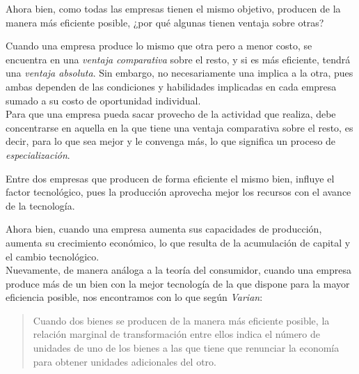 \documentclass[a4paper,12pt]{report}
\begin{document}
\vspace{0.5cm}

Ahora bien, como todas las empresas tienen el mismo objetivo, producen de la manera más eficiente posible, ¿por qué algunas tienen ventaja sobre otras?\\

\vspace{0.5cm}

Cuando una empresa produce lo mismo que otra pero a menor costo, se encuentra en una \emph{ventaja comparativa} sobre el resto, y si es más eficiente, tendrá una \emph{ventaja absoluta}. Sin embargo, no necesariamente una implica a la otra, pues ambas dependen de las condiciones y habilidades implicadas en cada empresa sumado a su costo de oportunidad individual.\\

Para que una empresa pueda sacar provecho de la actividad que realiza, debe concentrarse en aquella en la que tiene una ventaja comparativa sobre el resto, es decir, para lo que sea mejor y le convenga más, lo que significa un proceso de \emph{especialización}.\\

\vspace{0.5cm}

Entre dos empresas que producen de forma eficiente el mismo bien, influye el factor tecnológico, pues la producción aprovecha mejor los recursos con el avance de la tecnología.\\

\vspace{0.5cm}

Ahora bien, cuando una empresa aumenta sus capacidades de producción, aumenta su crecimiento económico, lo que resulta de la acumulación de capital y el cambio tecnológico.\\

Nuevamente, de manera análoga a la teoría del consumidor, cuando una empresa produce más de un bien con la mejor tecnología de la que dispone para la mayor eficiencia posible, nos encontramos con lo que según \emph{Varian}:\\

\begin{quote}
Cuando dos bienes se producen de la manera más eficiente posible, la relación marginal de transformación entre ellos indica el número de unidades de uno de los bienes a las que tiene que renunciar la economía para obtener unidades adicionales del otro.
\end{quote}
\end{document}
